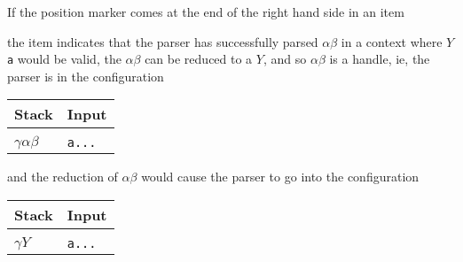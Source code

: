 \documentclass[8pt,a4paper,compress]{beamer}
\newcommand{\mm}[1]{$#1$}
\newenvironment{spaced}
{
\smallskip
\hspace{.5cm}
\begin{minipage}[c]{\textwidth}
}
{
\end{minipage}
\smallskip
}
\begin{document}
\begin{frame}[fragile]
\pause

If the position marker comes at the end of the right hand side in an item

\begin{spaced}
\begin{production}
[Y ::= \mm{\alpha \beta \cdot}, \lstinline{a}]
\end{production}
\end{spaced}

\noindent the item indicates that the parser has successfully parsed $\alpha \beta$ in a context where $Y$\lstinline{a} would be valid, the $\alpha \beta$ can be reduced to a $Y$, and so $\alpha \beta$ is a handle, ie, the parser  is in the configuration

\begin{table}[H]
\begin{tabular}{ll}
Stack & Input \\ \hline \\
$\gamma \alpha \beta$ & \lstinline$a...$
\end{tabular}
\end{table}

\noindent and the reduction of $\alpha \beta$ would cause the parser to go into the configuration

\begin{table}[H]
\begin{tabular}{ll}
Stack & Input \\ \hline \\
$\gamma Y$ & \lstinline$a...$
\end{tabular}
\end{table}
\end{frame}
\end{document}
